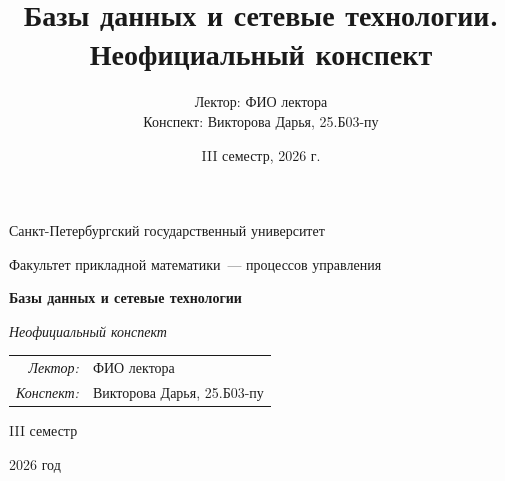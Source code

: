 \documentclass[12pt,a4paper]{report}
\title{Базы данных и сетевые технологии. Неофициальный конспект}
\author{Лектор: ФИО лектора\\
Конспект: Викторова Дарья, 25.Б03-пу}
\date{III семестр, 2026 г.}
\begin{document}
\begin{titlepage}
    \thispagestyle{empty}
    \begin{center}
        \vspace*{0.6cm}

        {\large Санкт-Петербургский государственный университет\par}
        \vspace{0.35em}
        {\normalsize Факультет прикладной математики~--- процессов управления\par}

        \vspace*{5.1cm}

        {\fontsize{30}{35}\selectfont\bfseries Базы данных и сетевые технологии\par}
        \vspace{0.65em}
        {\fontsize{17}{21}\selectfont\itshape Неофициальный конспект\par}

        \vspace{2.7cm}

        {\normalsize
        \begin{tabular}{@{}rl@{}}
            \textit{Лектор:} & ФИО лектора \\
            \textit{Конспект:} & Викторова Дарья, 25.Б03-пу
        \end{tabular}\par}

        \vfill

        {\large III семестр\par}
        \vspace{0.22em}
        {\large 2026 год\par}
        \vspace*{0.55cm}
    \end{center}
\end{titlepage}

\tableofcontents
\newpage

\setcounter{lection}{0}

\end{document}
